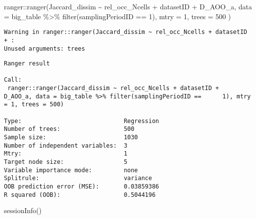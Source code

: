 \documentclass[
  letterpaper,
  DIV=11,
  numbers=noendperiod]{scrreprt}
\newenvironment{Shaded}{\begin{snugshade}}{\end{snugshade}}
\newcommand{\AttributeTok}[1]{\textcolor[rgb]{0.40,0.45,0.13}{#1}}
\newcommand{\DecValTok}[1]{\textcolor[rgb]{0.68,0.00,0.00}{#1}}
\newcommand{\FunctionTok}[1]{\textcolor[rgb]{0.28,0.35,0.67}{#1}}
\newcommand{\NormalTok}[1]{\textcolor[rgb]{0.00,0.23,0.31}{#1}}
\newcommand{\SpecialCharTok}[1]{\textcolor[rgb]{0.37,0.37,0.37}{#1}}
\begin{document}
\begin{Shaded}
\begin{Highlighting}[]
\NormalTok{ranger}\SpecialCharTok{::}\FunctionTok{ranger}\NormalTok{(Jaccard\_dissim }\SpecialCharTok{\textasciitilde{}}\NormalTok{ rel\_occ\_Ncells }\SpecialCharTok{+}\NormalTok{ datasetID }\SpecialCharTok{+}\NormalTok{ D\_AOO\_a,}
               \AttributeTok{data =}\NormalTok{ big\_table }\SpecialCharTok{\%\textgreater{}\%}
                 \FunctionTok{filter}\NormalTok{(samplingPeriodID }\SpecialCharTok{==} \DecValTok{1}\NormalTok{), }\AttributeTok{mtry =} \DecValTok{1}\NormalTok{, }\AttributeTok{trees =} \DecValTok{500}
\NormalTok{)}
\end{Highlighting}
\end{Shaded}

\begin{verbatim}
Warning in ranger::ranger(Jaccard_dissim ~ rel_occ_Ncells + datasetID + :
Unused arguments: trees
\end{verbatim}

\begin{verbatim}
Ranger result

Call:
 ranger::ranger(Jaccard_dissim ~ rel_occ_Ncells + datasetID +      D_AOO_a, data = big_table %>% filter(samplingPeriodID ==      1), mtry = 1, trees = 500)

Type:                             Regression
Number of trees:                  500
Sample size:                      1030
Number of independent variables:  3
Mtry:                             1
Target node size:                 5
Variable importance mode:         none
Splitrule:                        variance
OOB prediction error (MSE):       0.03859386
R squared (OOB):                  0.5044196
\end{verbatim}

\begin{Shaded}
\begin{Highlighting}[]
\FunctionTok{sessionInfo}\NormalTok{()}
\end{Highlighting}
\end{Shaded}
\end{document}
